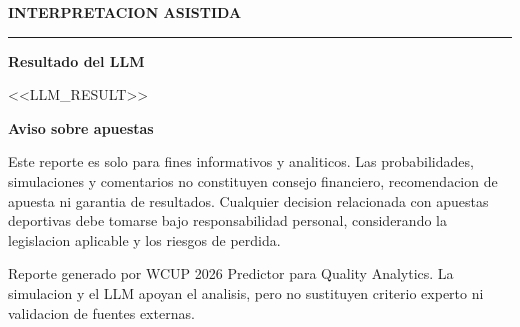 \documentclass[11pt,letterpaper]{article}
\newcommand{\qasection}[1]{%
\vspace{0.9em}
{\color{qaturquoise}\rule{0.14\linewidth}{1.2pt}}\par
{\Large\bfseries\color{qaink}#1}\par
\vspace{0.25em}}
\newcommand{\qakicker}[1]{%
{\small\bfseries\color{qaturquoise}\MakeUppercase{#1}}\par\vspace{0.25em}}
\newcommand{\qadisclaimer}[1]{%
\begingroup
\setlength{\fboxsep}{8pt}
\colorbox{qasoft}{%
\begin{minipage}{0.94\linewidth}
{\footnotesize\bfseries\color{qaink}Aviso sobre apuestas}\par
{\footnotesize\color{qamutex}#1}
\end{minipage}}
\endgroup}
\begin{document}
\qakicker{Interpretacion asistida}
\qasection{Resultado del LLM}
<<LLM_RESULT>>

\qadisclaimer{Este reporte es solo para fines informativos y analiticos. Las probabilidades, simulaciones y comentarios no constituyen consejo financiero, recomendacion de apuesta ni garantia de resultados. Cualquier decision relacionada con apuestas deportivas debe tomarse bajo responsabilidad personal, considerando la legislacion aplicable y los riesgos de perdida.}

\vfill
{\footnotesize\color{qamutex}
Reporte generado por WCUP 2026 Predictor para Quality Analytics. La simulacion y el LLM apoyan el analisis, pero no sustituyen criterio experto ni validacion de fuentes externas.
}
\end{document}
